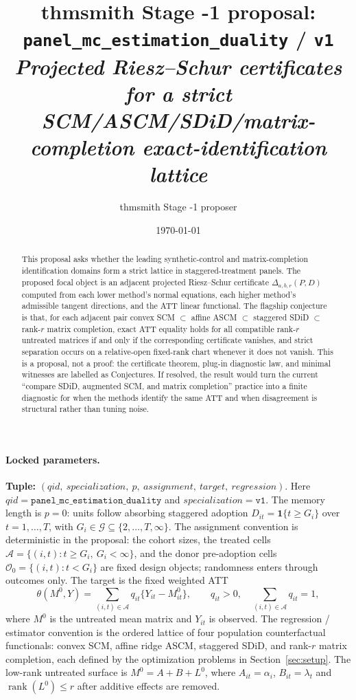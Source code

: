 \documentclass[11pt]{article}
\title{thmsmith Stage -1 proposal: \texttt{panel\_mc\_estimation\_duality} / \texttt{v1}%
  \\ \large\textit{Projected Riesz--Schur certificates for a strict SCM/ASCM/SDiD/matrix-completion exact-identification lattice}}
\author{thmsmith Stage -1 proposer}
\date{\today}
\newcommand{\one}{\mathbf{1}}
\theoremstyle{definition}
\theoremstyle{plain}
\theoremstyle{remark}
\begin{document}
\maketitle


\paragraph{Locked parameters.}
\textbf{Tuple:} $(qid,\ specialization,\ p,\ assignment,\ target,\ regression)$.
Here $qid=\texttt{panel\_mc\_estimation\_duality}$ and
$specialization=\texttt{v1}$. The memory length is $p=0$: units follow
absorbing staggered adoption $D_{it}=\one\{t\ge G_i\}$ over
$t=1,\ldots,T$, with $G_i\in\mathcal G\subseteq\{2,\ldots,T,\infty\}$.
The assignment convention is deterministic in the proposal: the cohort sizes,
the treated cells $\mathcal A=\{(i,t):t\ge G_i,\ G_i<\infty\}$, and the
donor pre-adoption cells $\mathcal O_0=\{(i,t):t<G_i\}$ are fixed design
objects; randomness enters through outcomes only. The target is the fixed
weighted ATT
\[
  \theta(M^0,Y)=\sum_{(i,t)\in\mathcal A}q_{it}\{Y_{it}-M^0_{it}\},
  \qquad q_{it}>0,\quad \sum_{(i,t)\in\mathcal A}q_{it}=1,
\]
where $M^0$ is the untreated mean matrix and $Y_{it}$ is observed. The
regression / estimator convention is the ordered lattice of four population
counterfactual functionals: convex SCM, affine ridge ASCM, staggered SDiD, and
rank-$r$ matrix completion, each defined by the optimization problems in
Section~\ref{sec:setup}. The low-rank untreated surface is
$M^0=A+B+L^0$, where $A_{it}=\alpha_i$, $B_{it}=\lambda_t$ and
$\operatorname{rank}(L^0)\le r$ after additive effects are removed.

\begin{abstract}
This proposal asks whether the leading synthetic-control and matrix-completion
identification domains form a strict lattice in staggered-treatment panels.
The proposed focal object is an adjacent projected Riesz--Schur certificate
$\Delta_{a,b,r}(P,D)$ computed from each lower method's normal equations, each
higher method's admissible tangent directions, and the ATT linear functional.
The flagship conjecture is that, for each adjacent pair
convex SCM $\subset$ affine ASCM $\subset$ staggered SDiD $\subset$ rank-$r$
matrix completion, exact ATT equality holds for all compatible rank-$r$
untreated matrices if and only if the corresponding certificate vanishes, and
strict separation occurs on a relative-open fixed-rank chart whenever it does
not vanish. This is a proposal, not a proof: the certificate theorem, plug-in
diagnostic law, and minimal witnesses are labelled as Conjectures. If resolved,
the result would turn the current
``compare SDiD, augmented SCM, and matrix completion'' practice into a finite
diagnostic for when the methods identify the same ATT and when disagreement is
structural rather than tuning noise.
\end{abstract}
\end{document}
